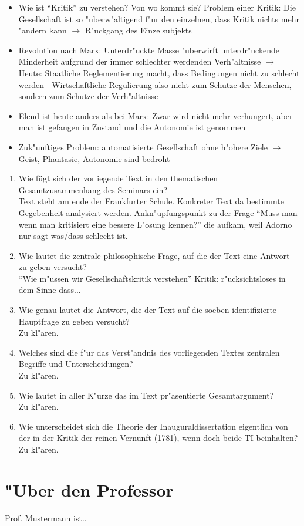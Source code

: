 \documentclass[emulatestandardclasses]{scrartcl}
\begin{document}
\begin{itemize}
  \item Wie ist "`Kritik"' zu verstehen? Von wo kommt sie? Problem einer Kritik: Die Gesellschaft ist so "uberw"altigend f"ur den einzelnen, dass Kritik nichts mehr "andern kann $\rightarrow$ R"uckgang des Einzelsubjekts
  \item Revolution nach Marx: Unterdr"uckte Masse "uberwirft unterdr"uckende Minderheit aufgrund der immer schlechter werdenden Verh"altnisse $\rightarrow$ Heute: Staatliche Reglementierung macht, dass Bedingungen nicht zu schlecht werden | Wirtschaftliche Regulierung also nicht zum Schutze der Menschen, sondern zum Schutze der Verh"altnisse
   \item Elend ist heute anders als bei Marx: Zwar wird nicht mehr verhungert, aber man ist gefangen in Zustand und die Autonomie ist genommen
  \item Zuk"unftiges Problem: automatisierte Gesellschaft ohne h"ohere Ziele $\rightarrow$ Geist, Phantasie, Autonomie sind bedroht

\end{itemize}


\begin{enumerate}
  \item {\color{NavyBlue}Wie fügt sich der vorliegende Text in den thematischen Gesamtzusammenhang des Seminars ein?}\\
{\color{ForestGreen} Text steht am ende der Frankfurter Schule. Konkreter Text da bestimmte Gegebenheit analysiert werden. Ankn"upfungspunkt zu der Frage "`Muss man wenn man kritisiert eine bessere L"osung kennen?"' die aufkam, weil Adorno nur sagt was/dass schlecht ist.}
  \item {\color{NavyBlue}Wie lautet die zentrale philosophische Frage, auf die der Text eine Antwort zu geben versucht?}\\
{\color{ForestGreen} "`Wie m"ussen wir Gesellschaftskritik verstehen"' Kritik: r"ucksichtsloses in dem Sinne dass...}
    \item {\color{NavyBlue} Wie genau lautet die Antwort, die der Text auf die soeben identifizierte Hauptfrage zu geben versucht?}\\
{\color{ForestGreen} Zu kl"aren.}
    \item {\color{NavyBlue} Welches sind die f"ur das Verst"andnis des vorliegenden Textes zentralen Begriffe und Unterscheidungen?}\\
{\color{ForestGreen} Zu kl"aren.}
    \item {\color{NavyBlue} Wie lautet in aller K"urze das im Text pr"asentierte Gesamtargument?}\\
{\color{ForestGreen} Zu kl"aren.}
    \item {\color{NavyBlue} Wie unterscheidet sich die Theorie der Inauguraldissertation
eigentlich von der in der Kritik der reinen Vernunft (1781), wenn doch beide TI beinhalten?}\\
{\color{ForestGreen} Zu kl"aren.}
\end{enumerate}


\newpage
\section{"Uber den Professor}
Prof. Mustermann ist..


\end{document}
